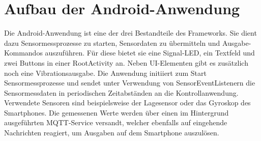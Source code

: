 \documentclass[11pt,a4paper]{report}
\begin{document}
\chapter{Aufbau der Android-Anwendung}\label{chap:app}
Die Android-Anwendung ist eine der drei Bestandteile des Frameworks.
Sie dient dazu Sensormessprozesse zu starten, Sensordaten zu übermitteln und Ausgabe-Kommandos auszuführen.
Für diese bietet sie eine Signal-LED, ein Textfeld und zwei Buttons in einer RootActivity an.
Neben UI-Elementen gibt es zusätzlich noch eine Vibrationsausgabe. 
Die Anwendung initiiert zum Start Sensormessprozesse und sendet unter Verwendung von SensorEventListenern die Sensormessdaten in periodischen Zeitabständen an die Kontrollanwendung.
Verwendete Sensoren sind beispielsweise der Lagesensor oder das Gyroskop des Smartphones.
Die gemessenen Werte werden über einen im Hintergrund ausgeführten MQTT-Service versandt, welcher ebenfalls auf eingehende Nachrichten reagiert, um Ausgaben auf dem Smartphone auszulösen.
\end{document}
